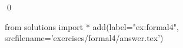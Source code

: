 
\begin{ex} 
  \label{ex:formal4}
  
  \qed
\end{ex} 
\begin{python0}
from solutions import *
add(label="ex:formal4",
    srcfilename='exercises/formal4/answer.tex') 
\end{python0}
